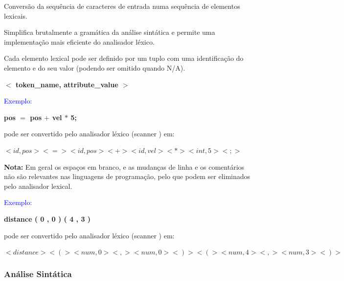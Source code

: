 \documentclass{article}
\begin{document}
\begin{flushleft}
  \item Conversão da sequência de caracteres de entrada numa
  sequência de elementos lexicais.
  \item Simplifica brutalmente a gramática da análise sintática e permite uma
  implementação mais eficiente do analisador léxico.
  \item Cada elemento lexical pode ser definido por um tuplo com uma identificação
  do elemento e do seu valor (podendo ser omitido quando N/A).
\end{flushleft}

\begin{center}
  \textbf{$<$ token\_name, attribute\_value $>$}
\end{center}

\begin{flushleft}
  \textcolor{Blue}{Exemplo:} \break

  \textbf{pos $=$ pos $+$ vel $*$ 5;}

  \vspace{3mm}

  pode ser convertido pelo analisador léxico (scanner ) em:
  
  \textcolor{BrickRed}{$< i d , pos> <=> < i d , pos> <+> < i d , v e l > <*> < i n t ,5 > <; >$}
\end{flushleft}

\begin{flushleft}
  \textbf{Nota:} Em geral os espaços em branco, e as mudanças de linha
  e os comentários não são relevantes nas linguagens de
  programação, pelo que podem ser eliminados pelo
  analisador lexical.
\end{flushleft}

\begin{flushleft}
  \textcolor{Blue}{Exemplo:} \break

  \textbf{distance ( 0 , 0 ) ( 4 , 3 )}

  \vspace{3mm}

  pode ser convertido pelo analisador léxico (scanner ) em:
  
  \textcolor{BrickRed}{$< d i s t a n c e > <(> <num,0 > <,> <num,0 > <)>
  <(> <num,4 > <,> <num,3 > <)>$}
\end{flushleft}

\pagebreak

\subsubsection{Análise Sintática}
\end{document}
